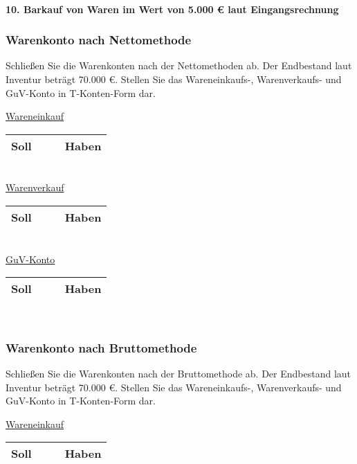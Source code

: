 \documentclass[paper=a4, fontsize=11pt]{scrartcl}
\numberwithin{equation}{section}
\numberwithin{figure}{section}
\numberwithin{table}{section}
\begin{document}
\paragraph{10. Barkauf von Waren im Wert von 5.000 € laut Eingangsrechnung}


\subsubsection{Warenkonto nach Nettomethode}

Schließen Sie die Warenkonten nach der Nettomethoden ab. Der Endbestand laut Inventur beträgt 70.000 €. Stellen Sie das Wareneinkaufs-, Warenverkaufs- und GuV-Konto in T-Konten-Form dar.

\underline{Wareneinkauf}

\begin{tabular}{cc|cc}
\hline
Soll & & & Haben \\
\hline
\end{tabular}
\\

\underline{Warenverkauf}

\begin{tabular}{cc|cc}
\hline
Soll & & & Haben \\
\hline
\end{tabular}
\\

\underline{GuV-Konto}

\begin{tabular}{cc|cc}
\hline
Soll & & & Haben \\
\hline
\end{tabular}
\\


\subsubsection{Warenkonto nach Bruttomethode}

Schließen Sie die Warenkonten nach der Bruttomethode ab. Der Endbestand laut Inventur beträgt 70.000 €. Stellen Sie das Wareneinkaufs-, Warenverkaufs- und GuV-Konto in T-Konten-Form dar.

\underline{Wareneinkauf}

\begin{tabular}{cc|cc}
\hline
Soll & & & Haben \\
\hline
\end{tabular}
\\
\end{document}
